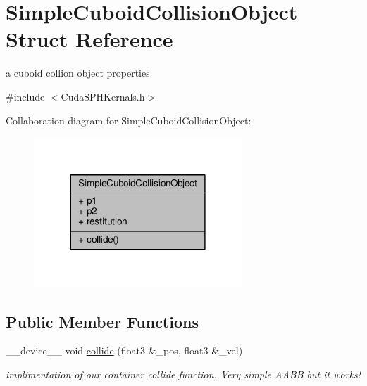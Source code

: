 \hypertarget{struct_simple_cuboid_collision_object}{\section{Simple\-Cuboid\-Collision\-Object Struct Reference}
\label{struct_simple_cuboid_collision_object}
}


a cuboid collion object properties  




{\ttfamily \#include $<$Cuda\-S\-P\-H\-Kernals.\-h$>$}



Collaboration diagram for Simple\-Cuboid\-Collision\-Object\-:\nopagebreak
\begin{figure}[H]
\begin{center}
\leavevmode
\includegraphics[width=222pt]{struct_simple_cuboid_collision_object__coll__graph}
\end{center}
\end{figure}
\subsection*{Public Member Functions}
\begin{DoxyCompactItemize}
\item 
\-\_\-\-\_\-device\-\_\-\-\_\- void \hyperlink{struct_simple_cuboid_collision_object_a82b63456b55c9f85d9437b996311a61f}{collide} (float3 \&\-\_\-pos, float3 \&\-\_\-vel)
\begin{DoxyCompactList}\small\item\em implimentation of our container collide function. Very simple A\-A\-B\-B but it works! \end{DoxyCompactList}\end{DoxyCompactItemize}
